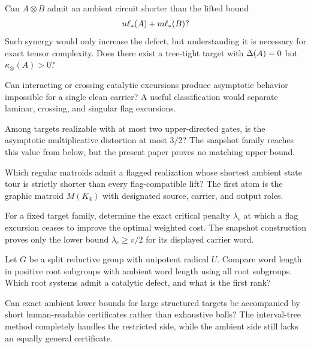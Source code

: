 \begin{question}
Can $A\otimes B$ admit an ambient circuit shorter than the lifted bound
\[
n\ell_{*}(A)+m\ell_{*}(B)?
\]
Such synergy would only increase the defect, but understanding it is necessary for exact tensor complexity.  Does there exist a tree-tight target with $\Delta(A)=0$ but $\kappa_\otimes(A)>0$?
\end{question}

\begin{question}
Can interacting or crossing catalytic excursions produce asymptotic behavior impossible for a single clean carrier?  A useful classification would separate laminar, crossing, and singular flag excursions.
\end{question}

\begin{question}
Among targets realizable with at most two upper-directed gates, is the asymptotic multiplicative distortion at most $3/2$?  The snapshot family reaches this value from below, but the present paper proves no matching upper bound.
\end{question}

\begin{question}
Which regular matroids admit a flagged realization whose shortest ambient state tour is strictly shorter than every flag-compatible lift?  The first atom is the graphic matroid $M(K_4)$ with designated source, carrier, and output roles.
\end{question}

\begin{question}
For a fixed target family, determine the exact critical penalty $\lambda_c$ at which a flag excursion ceases to improve the optimal weighted cost.  The snapshot construction proves only the lower bound $\lambda_c\ge v/2$ for its displayed carrier word.
\end{question}

\begin{question}
Let $G$ be a split reductive group with unipotent radical $U$.  Compare word length in positive root subgroups with ambient word length using all root subgroups.  Which root systems admit a catalytic defect, and what is the first rank?
\end{question}

\begin{question}
Can exact ambient lower bounds for large structured targets be accompanied by short human-readable certificates rather than exhaustive balls?  The interval-tree method completely handles the restricted side, while the ambient side still lacks an equally general certificate.
\end{question}


